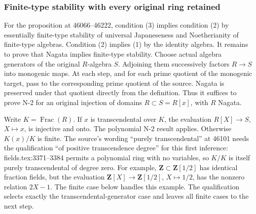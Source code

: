 \subsubsection{Finite-type stability with every original ring retained}\label{algebra-proof-067-finite-type-stability-with-every-original-ring-retained}

For the proposition at 46066--46222, condition (3) implies condition (2) by essentially finite-type stability of universal Japaneseness and Noetherianity of finite-type algebras. Condition (2) implies (1) by the identity algebra. It remains to prove that Nagata implies finite-type stability. Choose actual algebra generators of the original \(R\)-algebra \(S\). Adjoining them successively factors \(R\to S\) into monogenic maps. At each step, and for each prime quotient of the monogenic target, pass to the corresponding prime quotient of the source. Nagata is preserved under that quotient directly from the definition. Thus it suffices to prove N-2 for an original injection of domains \(R\subset S=R[x]\), with \(R\) Nagata.

Write \(K=\operatorname{Frac}(R)\). If \(x\) is transcendental over \(K\), the evaluation \(R[X]\to S\), \(X\mapsto x\), is injective and onto. The polynomial N-2 result applies. Otherwise \(K(x)/K\) is finite. The source's wording ``purely transcendental'' at 46101 needs the qualification ``of positive transcendence degree'' for this first inference: fields.\AlgebraIdentifierBreak{}tex:\AlgebraIdentifierBreak{}3371--\AlgebraIdentifierBreak{}3384 permits a polynomial ring with no variables, so \(K/K\) is itself purely transcendental of degree zero. For example, \(\mathbf Z\subset\mathbf Z[1/2]\) has identical fraction fields, but the evaluation \(\mathbf Z[X]\to\mathbf Z[1/2]\), \(X\mapsto1/2\), has the nonzero relation \(2X-1\). The finite case below handles this example. The qualification selects exactly the transcendental-generator case and leaves all finite cases to the next step.

